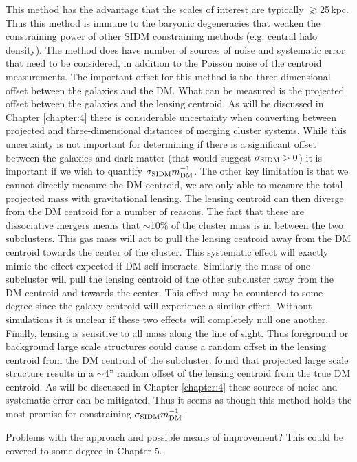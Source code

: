 This method has the advantage that the scales of interest are typically $\gtrsim$25\,kpc.
Thus this method is immune to the baryonic degeneracies that weaken the constraining power of other SIDM constraining methods (e.g. central halo density).
The method does have number of sources of noise and systematic error that need to be considered, in addition to the Poisson noise of the centroid measurements.
The important offset for this method is the three-dimensional offset between the galaxies and the DM.
What can be measured is the projected offset between the galaxies and the lensing centroid.
As will be discussed in Chapter \ref{chapter:4} there is considerable uncertainty when converting between projected and three-dimensional distances of merging cluster systems.
While this uncertainty is not important for determining if there is a significant offset between the galaxies and dark matter (that would suggest $\sigma_{\rm SIDM}>0$) it is important if we wish to quantify $\sigma_{\rm SIDM}m^{-1}_{\rm DM}$.
The other key limitation is that we cannot directly measure the DM centroid, we are only able to measure the total projected mass with gravitational lensing.
The lensing centroid can then diverge from the DM centroid for a number of reasons.
The fact that these are dissociative mergers means that $\sim$10\% of the cluster mass is in between the two subclusters.
This gas mass will act to pull the lensing centroid away from the DM centroid towards the center of the cluster.
This systematic effect will exactly mimic the effect expected if DM self-interacts.
Similarly the mass of one subcluster will pull the lensing centroid of the other subcluster away from the DM centroid and towards the center.
This effect may be countered to some degree since the galaxy centroid will experience a similar effect.
Without simulations it is unclear if these two effects will completely null one another.
Finally, lensing is sensitive to all mass along the line of sight.
Thus foreground or background large scale structures could cause a random offset in the lensing centroid from the DM centroid of the subcluster.
\citet{Dietrich:2011gs} found that projected large scale structure results in a $\sim$4'' random offset of the lensing centroid from the true DM centroid.
As will be discussed in Chapter \ref{chapter:4} these sources of noise and systematic error can be mitigated.
Thus it seems as though this method holds the most promise for constraining $\sigma_{\rm SIDM}m^{-1}_{\rm DM}$.

Problems with the \citep{Randall:2008hs} approach and possible means of improvement? This could be covered to some degree in Chapter 5.


